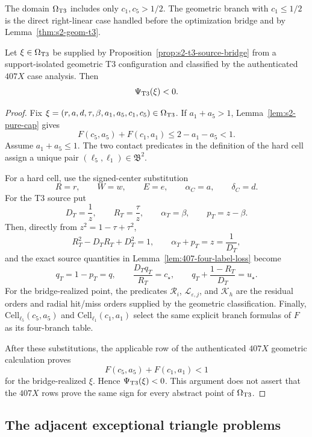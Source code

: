 The domain $\Omega_{\rm T3}$ includes only $c_1,c_5>1/2$.  The geometric
branch with $c_1\le1/2$ is the direct right-linear case handled before the
optimization bridge and by Lemma~\ref{thm:s2-geom-t3}.

\begin{theorem}
\label{thm:s2-source-t3}
Let $\xi\in\Omega_{\rm T3}$ be supplied by
Proposition~\ref{prop:s2-t3-source-bridge} from a support-isolated geometric
T3 configuration and classified by the authenticated $407X$ case analysis.
Then
\[
 \Psi_{\rm T3}(\xi)<0.
\]
\end{theorem}

\begin{proof}
Fix
$\xi=(r,a,d,\tau,\beta,a_1,a_5,c_1,c_5)\in\Omega_{\rm T3}$.
If $a_1+a_5>1$, Lemma~\ref{lem:s2-pure-cap} gives
\[
 F(c_5,a_5)+F(c_1,a_1)
 \le2-a_1-a_5<1.
\]
Assume $a_1+a_5\le1$.  The two contact predicates in the definition of the
hard cell assign a unique pair
$(\ell_5,\ell_1)\in\mathfrak B^2$.

For a hard cell, use the signed-center substitution
\[
 R=r,\qquad W=w,\qquad E=e,
 \qquad \alpha_C=a,\qquad\delta_C=d.
\]
For the T3 source put
\[
 D_T=\frac1z,
 \qquad R_T=\frac\tau z,
 \qquad \alpha_T=\beta,
 \qquad p_T=z-\beta.
\]
Then, directly from $z^2=1-\tau+\tau^2$,
\[
 R_T^2-D_TR_T+D_T^2=1,
 \qquad
 \alpha_T+p_T=z=\frac1{D_T},
\]
and the exact source quantities in Lemma~\ref{lem:407-four-label-loss} become
\[
 q_T=1-p_T=q,
 \qquad
 \frac{D_Tq_T}{R_T}=c_\star,
 \qquad
 q_T+\frac{1-R_T}{D_T}=u_\star.
\]
For the bridge-realized point, the predicates $\mathcal R_i$,
$\mathcal L_{\varepsilon,j}$, and $\mathcal K_h$ are the residual orders and
radial hit/miss orders supplied by the geometric classification.  Finally,
$\mathrm{Cell}_{\ell_5}(c_5,a_5)$ and
$\mathrm{Cell}_{\ell_1}(c_1,a_1)$ select the same explicit branch formulas
of $F$ as its four-branch table.

After these substitutions, the applicable row of the authenticated
$407X$ geometric calculation proves
\[
 F(c_5,a_5)+F(c_1,a_1)<1
\]
for the bridge-realized $\xi$.  Hence $\Psi_{\rm T3}(\xi)<0$.  This argument
does not assert that the $407X$ rows prove the same sign for every abstract
point of $\Omega_{\rm T3}$.
\end{proof}

\subsection{The adjacent exceptional triangle problems}

